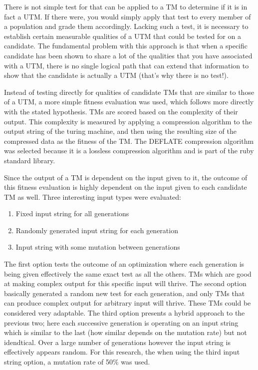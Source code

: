 There is not simple test for that can be applied to a TM to determine if it is in fact a UTM. If there were, you would simply apply that test to every member of a population and grade them accordingly. Lacking such a test, it is necessary to establish certain measurable qualities of a UTM that could be tested for on a candidate. The fundamental problem with this approach is that when a specific candidate has been shown to share a lot of the qualities that you have associated with a UTM, there is no single logical path that can extend that information to show that the candidate is actually a UTM (that's why there is no test!). 

Instead of testing directly for qualities of candidate TMs that are similar to those of a UTM, a more simple fitness evaluation was used, which follows more directly with the stated hypothesis. TMs are scored based on the complexity of their output. This complexity is measured by applying a compression algorithm to the output string of the turing machine, and then using the resulting size of the compressed data as the fitness of the TM. The DEFLATE compression algorithm was selected because it is a lossless compression algorithm and is part of the ruby standard library.

Since the output of a TM is dependent on the input given to it, the outcome of this fitness evaluation is highly dependent on the input given to each candidate TM as well. Three interesting input types were evaluated: 

\begin{enumerate}
	\item Fixed input string for all generations
	\item Randomly generated input string for each generation
	\item Input string with some mutation between generations
\end{enumerate}

The first option tests the outcome of an optimization where each generation is being given effectively the same exact test as all the others. TMs which are good at making complex output for this specific input will thrive. The second option basically generated a random new test for each generation, and only TMs that can produce complex output for arbitrary input will thrive. These TMs could be considered very adaptable. The third option presents a hybrid approach to the previous two; here each successive generation is operating on an input string which is similar to the last (how similar depends on the mutation rate) but not idendtical. Over a large number of generations however the input string is effectively appears random. For this research, the when using the third input string option, a mutation rate of 50\% was used. 

